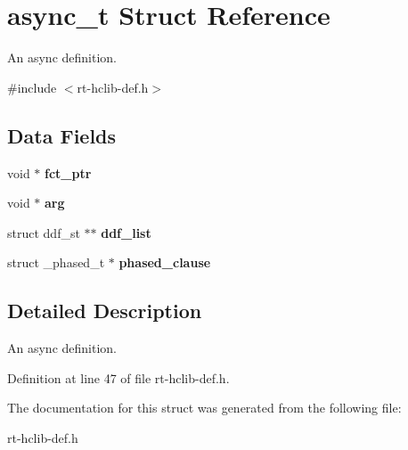 \hypertarget{structasync__t}{\section{async\-\_\-t Struct Reference}
\label{structasync__t}
}


An async definition.  




{\ttfamily \#include $<$rt-\/hclib-\/def.\-h$>$}

\subsection*{Data Fields}
\begin{DoxyCompactItemize}
\item 
\hypertarget{structasync__t_a60497e95c8651504725a83dbf7fbeb57}{void $\ast$ {\bfseries fct\-\_\-ptr}}\label{structasync__t_a60497e95c8651504725a83dbf7fbeb57}

\item 
\hypertarget{structasync__t_a9c90c92ed9a72592755cf1f2e6d2e0c0}{void $\ast$ {\bfseries arg}}\label{structasync__t_a9c90c92ed9a72592755cf1f2e6d2e0c0}

\item 
\hypertarget{structasync__t_a0ab92bffb242590f1ff98358d631ecc1}{struct ddf\-\_\-st $\ast$$\ast$ {\bfseries ddf\-\_\-list}}\label{structasync__t_a0ab92bffb242590f1ff98358d631ecc1}

\item 
\hypertarget{structasync__t_a68461aaab64bbc373c98182abee9327d}{struct \-\_\-phased\-\_\-t $\ast$ {\bfseries phased\-\_\-clause}}\label{structasync__t_a68461aaab64bbc373c98182abee9327d}

\end{DoxyCompactItemize}


\subsection{Detailed Description}
An async definition. 

Definition at line 47 of file rt-\/hclib-\/def.\-h.



The documentation for this struct was generated from the following file\-:\begin{DoxyCompactItemize}
\item 
rt-\/hclib-\/def.\-h\end{DoxyCompactItemize}

